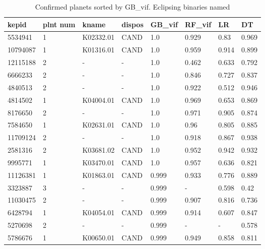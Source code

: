 \begin{table}[!htbp]
 \centering
 \caption{Confirmed planets sorted by GB\_vif. Eclipsing binaries named}
 \label{dataGBvifRFvifLRDTDTtab} 
  \begin{tabular}
{| 
 p{}| 
 p{}| 
 p{}| 
 p{}| 
 p{}| 
 p{}| 
 p{}| 
 p{}| 
}\hline 
\textbf{kepid} &\textbf{plnt num} &\textbf{kname} &\textbf{dispos} &\textbf{GB\_vif} &\textbf{RF\_vif} &\textbf{LR} &\textbf{DT} \\ \hline 
5534941 &1 &K02332.01 &CAND &1.0 &0.929 &0.83 &0.969 \\ \hline 
10794087 &1 &K01316.01 &CAND &1.0 &0.959 &0.914 &0.899 \\ \hline 
12115188 &2 &- &- &1.0 &0.462 &0.633 &0.792 \\ \hline 
6666233 &2 &- &- &1.0 &0.846 &0.727 &0.837 \\ \hline 
4840513 &2 &- &- &1.0 &0.922 &0.512 &0.946 \\ \hline 
4814502 &1 &K04004.01 &CAND &1.0 &0.969 &0.653 &0.869 \\ \hline 
8176650 &2 &- &- &1.0 &0.971 &0.905 &0.874 \\ \hline 
7584650 &1 &K02631.01 &CAND &1.0 &0.96 &0.805 &0.885 \\ \hline 
11709124 &2 &- &- &1.0 &0.918 &0.867 &0.938 \\ \hline 
2581316 &2 &K03681.02 &CAND &1.0 &0.952 &0.942 &0.932 \\ \hline 
9995771 &1 &K03470.01 &CAND &1.0 &0.957 &0.636 &0.821 \\ \hline 
11126381 &1 &K01863.01 &CAND &0.999 &0.933 &0.776 &0.889 \\ \hline 
3323887 &3 &- &- &0.999 &- &0.598 &0.42 \\ \hline 
11030475 &2 &- &- &0.999 &0.907 &0.816 &0.736 \\ \hline 
6428794 &1 &K04054.01 &CAND &0.999 &0.914 &0.607 &0.847 \\ \hline 
5270698 &2 &- &- &0.999 &- &- &0.578 \\ \hline 
5786676 &1 &K00650.01 &CAND &0.999 &0.949 &0.858 &0.811 \\ \hline 

\end{tabular}
\end{table}
